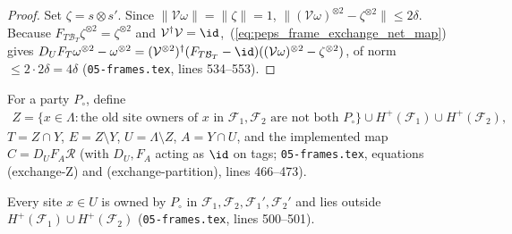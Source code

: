\begin{proof}\leanok
    Set $\zeta=s\otimes s'$. Since $\|\mathcal V\omega\|=\|\zeta\|=1$,
    $\lVert(\mathcal V\omega)^{\otimes2}-\zeta^{\otimes2}\rVert\le2\delta$.
    Because $F_{T\mathcal B_T}\zeta^{\otimes 2}=\zeta^{\otimes 2}$ and
    $\mathcal V^\dagger\mathcal V=\id$,~(\ref{eq:peps_frame_exchange_net_map})
    gives $D_UF_T\omega^{\otimes 2}-\omega^{\otimes 2}=(\mathcal V^{\otimes 2})^\dagger(F_{T\mathcal B_T}-\id)((\mathcal V\omega)^{\otimes 2}-\zeta^{\otimes 2})$,
    of norm $\le 2\cdot 2\delta=4\delta$ (\texttt{05-frames.tex}, lines 534--553).
\end{proof}

\begin{definition}
    \label{def:peps_frame_exchange_map}
    \leanok
    For a party $P_\circ$, define
    \begin{align}
        Z=\{x\in\Lambda:\text{the old site owners of }x\text{ in }\mathcal F_1,\mathcal F_2\text{ are not both }P_\circ\}
        \cup H^+(\mathcal F_1)\cup H^+(\mathcal F_2),
        \label{eq:peps_frame_exchange_Z}
    \end{align}
    $T=Z\cap Y$, $E=Z\setminus Y$, $U=\Lambda\setminus Z$, $A=Y\cap U$, and the
    implemented map $C=D_UF_A\mathcal R$ (with $D_U,F_A$ acting as $\id$ on
    tags; \texttt{05-frames.tex}, equations (exchange-Z) and
    (exchange-partition), lines 466--473).
\end{definition}

\begin{lemma}
    \label{lem:peps_frame_exchange_owners}
    \leanok
    Every site $x\in U$ is owned by $P_\circ$ in $\mathcal F_1,\mathcal F_2,\mathcal F_1',\mathcal F_2'$
    and lies outside $H^+(\mathcal F_1)\cup H^+(\mathcal F_2)$
    (\texttt{05-frames.tex}, lines 500--501).
\end{lemma}

